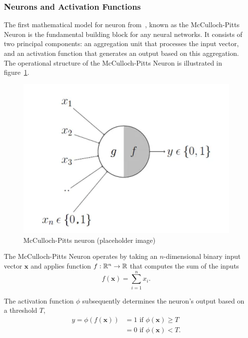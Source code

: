 \subsubsection{Neurons and Activation Functions}
The first mathematical model for neuron from~\cite{mcculloch}, known as the McCulloch-Pitts Neuron is the fundamental building block for any neural networks.
It consists of two principal components: an aggregation unit that processes the input vector, and an activation function that generates an output based on this aggregation.
The operational structure of the McCulloch-Pitts Neuron is illustrated in figure~\ref{fig:mccullochpittsneuron}.
\begin{figure}\label{fig:mccullochpittsneuron}
    \includegraphics{background/fig/mccullochpitts.png}
    \caption{McCulloch-Pitts neuron (placeholder image)}
\end{figure}
The McCulloch-Pitts Neuron operates by taking an $n$-dimensional binary input vector $\mathbf{x}$ and applies function $f : \mathbb{R}^n \rightarrow \mathbb{R}$ that computes the sum of the inputs
\begin{equation}
    f(\mathbf{x}) = \sum_{i=1}^{n} x_{i}.
\end{equation}

The activation function $\phi$ subsequently determines the neuron's output based on a threshold $T$,
\begin{align}
    y = \phi(f(\mathbf{x})) & = 1 \text{ if } \phi(\mathbf{x}) \geq T \\
                            & = 0 \text{ if } \phi(\mathbf{x}) < T. 
\end{align}

